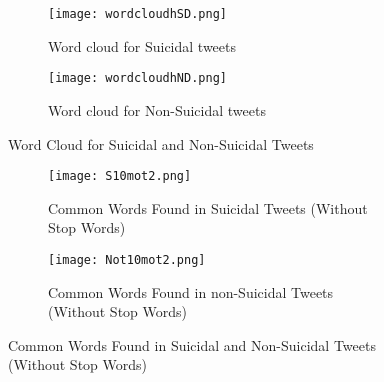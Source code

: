\documentclass[sn-mathphys,Numbered]{sn-jnl}%
\begin{document}
\begin{figure*}[t!]
    \centering
    \begin{subfigure}[t]{0.45\textwidth}
        \texttt{[image: wordcloudhSD.png]}
        \caption{\label{figW1} Word cloud for Suicidal tweets}
    \end{subfigure}%
    \begin{subfigure}[t]{0.45\textwidth} \hfill
        \texttt{[image: wordcloudhND.png]}
        \caption{\label{figW2} Word cloud for Non-Suicidal tweets}
    \end{subfigure}
    \caption{Word Cloud for Suicidal and Non-Suicidal Tweets}
\end{figure*}




\begin{figure*}[t!]
    \centering
    \begin{subfigure}[t]{0.45\textwidth}
        \texttt{[image: S10mot2.png]}
        \caption{\label{Common1} Common Words Found in Suicidal Tweets (Without Stop Words)}
    \end{subfigure}%
    \begin{subfigure}[t]{0.45\textwidth} \hfill
        \texttt{[image: Not10mot2.png]}
        \caption{\label{Common2} Common Words Found in non-Suicidal Tweets (Without Stop Words)}
    \end{subfigure}
    \caption{ 
   Common Words Found in Suicidal and Non-Suicidal Tweets (Without Stop Words)}
\end{figure*}

\end{document}
